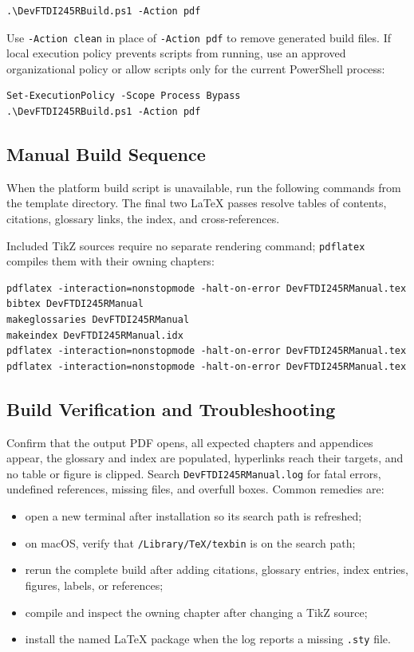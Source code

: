 \begin{verbatim}
.\DevFTDI245RBuild.ps1 -Action pdf
\end{verbatim}

Use \texttt{-Action clean} in place of \texttt{-Action pdf} to remove generated build files. If local execution policy prevents scripts from running, use an approved organizational policy or allow scripts only for the current PowerShell process:

\begin{verbatim}
Set-ExecutionPolicy -Scope Process Bypass
.\DevFTDI245RBuild.ps1 -Action pdf
\end{verbatim}

\subsection{Manual Build Sequence}

When the platform build script is unavailable, run the following commands from
the template directory. The final two LaTeX passes resolve tables of contents,
citations, glossary links, the index, and cross-references.

Included TikZ sources require no separate rendering command; \texttt{pdflatex}
compiles them with their owning chapters:

\begin{verbatim}
pdflatex -interaction=nonstopmode -halt-on-error DevFTDI245RManual.tex
bibtex DevFTDI245RManual
makeglossaries DevFTDI245RManual
makeindex DevFTDI245RManual.idx
pdflatex -interaction=nonstopmode -halt-on-error DevFTDI245RManual.tex
pdflatex -interaction=nonstopmode -halt-on-error DevFTDI245RManual.tex
\end{verbatim}

\subsection{Build Verification and Troubleshooting}

Confirm that the output PDF opens, all expected chapters and appendices appear,
the glossary and index are populated, hyperlinks reach their targets, and no
table or figure is clipped. Search \texttt{DevFTDI245RManual.log} for fatal errors,
undefined references, missing files, and overfull boxes. Common remedies are:

\begin{itemize}
\item open a new terminal after installation so its search path is refreshed;
\item on macOS, verify that \texttt{/Library/TeX/texbin} is on the search path;
\item rerun the complete build after adding citations, glossary entries, index
entries, figures, labels, or references;
\item compile and inspect the owning chapter after changing a TikZ source;
\item install the named LaTeX package when the log reports a missing
\texttt{.sty} file.
\end{itemize}

